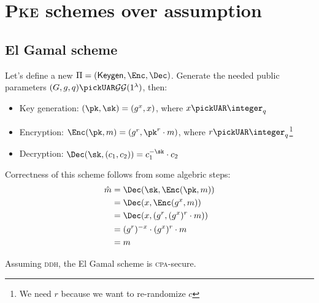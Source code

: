 
\section{\textsc{Pke} schemes over \ddh{} assumption}

\subsection{El Gamal scheme}

Let's define a new $\Pi = (\keygen, \Enc, \Dec)$. Generate the needed public parameters $(G,g,q) \pickUAR \groupgen(1^{\lambda})$\footnotemark, then:


\begin{itemize}
    \item Key generation: $(\pk, \sk) = (g^x, x)$, where $x \pickUAR \integer_q$
    \item Encryption: $\Enc(\pk, m) = (g^r, \pk^r \cdot m)$, where $r \pickUAR \integer_q$\footnote{We need $r$ because we want to re-randomize $c$}
    \item Decryption: $\Dec(\sk, (c_1, c_2))= c_1^{-\sk} \cdot c_2$
\end{itemize}

Correctness of this scheme follows from some algebric steps:
\begin{align*}
    \hat{m} &= \Dec(\sk, \Enc(\pk, m))          \\
            &= \Dec(x, \Enc(g^x, m))            \\
            &= \Dec(x, (g^r, (g^x)^r \cdot m))  \\
            &= (g^r)^{-x} \cdot (g^x)^r \cdot m \\
            &= m                                \\
\end{align*}

\begin{theorem}
    Assuming \textsc{ddh}, the El Gamal scheme is \textsc{cpa}-secure.
\end{theorem}

